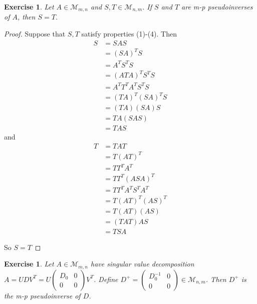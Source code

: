 \documentclass[12pt]{amsart}
\newtheorem{ex}[thm]{Exercise}
\newcommand{\MM}{\mathcal{M}}
\begin{document}
\begin{ex}
Let $A \in \MM_{m,n}$ and $S,T \in \MM_{n,m}$. If $S$ and $T$ are m-p pseudoinverses of $A$, then $S=T$. 
\end{ex}

\begin{proof}
Suppose that $S,T$ satisfy properties (1)-(4). Then 
\begin{align*}
S
&= SAS \\
&= (SA)^TS \\
&= A^TS^TS \\
&= (ATA)^TS^TS \\
&= A^TT^TA^TS^TS \\
&= (TA)^T(SA)^TS \\
&= (TA)(SA)S \\
&= TA(SAS) \\
&= TAS
\end{align*}
and 
\begin{align*}
T 
&= TAT \\
&= T(AT)^T \\
&= TT^TA^T \\
&= TT^T(ASA)^T \\
&= TT^TA^TS^TA^T \\
&= T(AT)^T (AS)^T \\
&= T(AT) (AS) \\
&= (TAT)AS \\
&= TSA 
\end{align*} 

So $S=T$
\end{proof}

\begin{ex}
Let $A \in \MM_{m, n}$ have singular value decomposition $A = UDV^T = U
\begin{pmatrix}
D_0 & 0 \\
0 & 0
\end{pmatrix}
V^T$. Define $D^+ = \begin{pmatrix}
D_0^{-1} & 0 \\
0 & 0
\end{pmatrix} \in \MM_{n,m}$. Then $D^+$ is the m-p pseudoinverse of $D$.
\end{ex}
\end{document}
